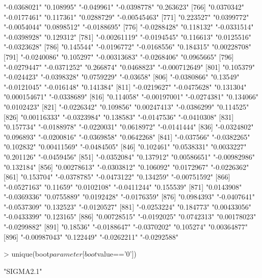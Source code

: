 \begin{Schunk}
\begin{Soutput}
[761] "-0.0368021"   "0.108995"     "-0.049961"    "-0.0398778"   "0.263623"    
[766] "0.0370342"    "-0.0177461"   "0.117361"     "0.0288729"    "-0.00545463" 
[771] "0.223527"     "0.0399772"    "-0.0054044"   "0.0898512"    "-0.0188695"  
[776] "-0.0288428"   "0.118132"     "-0.0331514"   "-0.0398928"   "0.129312"    
[781] "-0.00261119"  "-0.0194545"   "0.116613"     "0.0125516"    "-0.0323628"  
[786] "0.145544"     "-0.0196772"   "-0.0168556"   "0.184315"     "0.00228708"  
[791] "-0.0240086"   "0.105297"     "-0.00313683"  "-0.0268406"   "0.0965665"   
[796] "-0.0279447"   "-0.0371252"   "0.266874"     "0.0468823"    "-0.000712649"
[801] "0.105379"     "-0.024423"    "-0.0398328"   "0.0759229"    "-0.03658"    
[806] "-0.0380866"   "0.13549"      "-0.0121045"   "-0.016148"    "0.141384"    
[811] "-0.0219627"   "-0.0475628"   "0.131304"     "0.000154671"  "-0.0338689"  
[816] "0.114058"     "-0.00197001"  "-0.0274381"   "0.134066"     "0.0102423"   
[821] "-0.0226342"   "0.109856"     "0.00247413"   "-0.0386299"   "0.114525"    
[826] "0.00116333"   "-0.0323984"   "0.138583"     "-0.0147536"   "-0.0410308"  
[831] "0.157734"     "-0.0188978"   "-0.0220031"   "0.0618972"    "-0.0141444"  
[836] "-0.0324802"   "0.096893"     "-0.0200816"   "-0.0369858"   "0.0642268"   
[841] "-0.037566"    "-0.0382265"   "0.102832"     "0.00411569"   "-0.0484505"  
[846] "0.102461"     "0.0538331"    "0.0033227"    "0.201126"     "-0.0459456"  
[851] "-0.0352084"   "0.137912"     "0.00586651"   "-0.00982986"  "0.132184"    
[856] "0.00278613"   "-0.0303812"   "0.106092"     "0.0172967"    "-0.0226362"  
[861] "0.153704"     "-0.0378785"   "-0.0473122"   "0.134259"     "-0.00751592" 
[866] "-0.0527163"   "0.11659"      "0.0102108"    "-0.0411244"   "0.155539"    
[871] "0.0143908"    "-0.0369336"   "0.0755889"    "0.0192428"    "-0.0176359"  
[876] "0.0984393"    "-0.0407641"   "-0.0537309"   "0.132523"     "-0.0120527"  
[881] "-0.0253224"   "0.184773"     "0.00433056"   "-0.0433399"   "0.123165"    
[886] "0.00728515"   "-0.0192025"   "0.0742313"    "0.00178023"   "-0.0299882"  
[891] "0.18536"      "-0.0188647"   "-0.0370202"   "0.105274"     "0.00364877"  
[896] "-0.00987043"  "0.122449"     "-0.0262211"   "-0.0292588"  
\end{Soutput}
\begin{Sinput}
> unique(boot$parameter[boot$value=='0'])
\end{Sinput}
\begin{Soutput}
[1] "SIGMA2.1"
\end{Soutput}
\end{Schunk}
